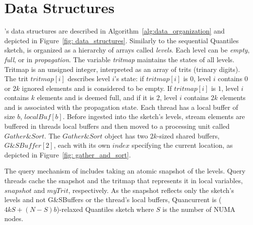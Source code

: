 \section{Data Structures} \label{sec:data_org}
\mysketch's data structures are described in Algorithm~\ref{alg:data_organization} and depicted in Figure~\ref{fig: data_structures}.
Similarly to the sequential Quantiles sketch, \mysketch is organized as a hierarchy of arrays called \emph{levels}. Each level can be \emph{empty}, \emph{full}, or in \emph{propagation}. The variable \emph{tritmap} maintains the states of all levels. Tritmap is an unsigned integer, interpreted as an array of trits (trinary digits). The trit $tritmap[i]$ describes level $i$'s state: if $tritmap[i]$ is $0$, level $i$ contains $0$ or $2k$ ignored elements and is considered to be empty. If $tritmap[i]$ is $1$, level $i$ contains $k$ elements and is deemed full, and if it is $2$, level $i$ contains $2k$ elements and is associated with the propagation state. Each thread has a local buffer of size $b$, $\mathit{localBuf[b]}$. Before ingested into the sketch's levels, stream elements are buffered in threads local buffers and then moved to a processing unit called $\mathit{Gather\&Sort}$. The $\mathit{Gather\&Sort}$ object has two $2k$-sized shared buffers, $\mathit{G\&SBuffer}[2]$, each with its own $\mathit{index}$ specifying the current location, as depicted in Figure~\ref{fig: gather_and_sort}. 

The query mechanism of \mysketch includes taking an atomic snapshot of the levels. Query threads cache the snapshot and the tritmap that represents it in local variables, 
$\mathit{snapshot}$ and $\mathit{myTrit}$, respectively. As the snapshot reflects only the sketch's levels and not G\&SBuffers or the thread's local buffers, Quancurrent is ($4kS+(N-S)b$)-relaxed Quantiles sketch where $S$ is the number of NUMA nodes. 


